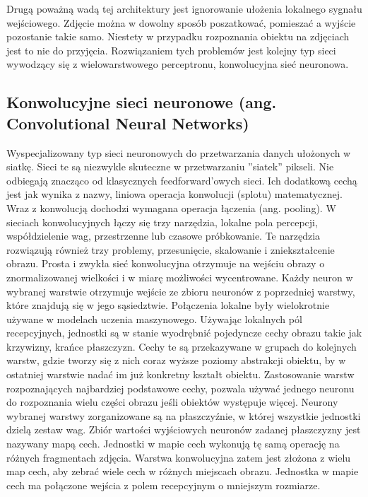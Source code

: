 \documentclass[12pt,a4paper,twoside,titlepage,openright]{book}
\begin{document}
Drugą poważną wadą tej architektury jest ignorowanie ułożenia lokalnego sygnału wejściowego. Zdjęcie można w dowolny sposób poszatkować, pomieszać a wyjście pozostanie takie samo. Niestety w przypadku rozpoznania obiektu na zdjęciach jest to nie do przyjęcia. Rozwiązaniem tych problemów jest kolejny typ sieci wywodzący się z wielowarstwowego perceptronu, konwolucyjna sieć neuronowa.

\subsection{Konwolucyjne sieci neuronowe (ang. Convolutional Neural Networks)}
Wyspecjalizowany typ sieci neuronowych do przetwarzania danych ułożonych w siatkę. Sieci te są niezwykle skuteczne w przetwarzaniu ''siatek'' pikseli. Nie odbiegają znacząco od klasycznych feedforward'owych sieci. Ich dodatkową cechą jest jak wynika z nazwy, liniowa operacja konwolucji (splotu) matematycznej. Wraz z konwolucją dochodzi wymagana operacja łączenia (ang. pooling).  W sieciach konwolucyjnych łączy się trzy narzędzia, lokalne pola percepcji, współdzielenie wag, przestrzenne lub czasowe próbkowanie. Te narzędzia rozwiązują również trzy problemy, przesunięcie, skalowanie i zniekształcenie obrazu.
Prosta i zwykła sieć konwolucyjna otrzymuje na wejściu obrazy o znormalizowanej wielkości i w miarę możliwości wycentrowane. Każdy neuron w wybranej warstwie otrzymuje wejście ze zbioru neuronów z poprzedniej warstwy, które znajdują się w jego sąsiedztwie. Połączenia lokalne były wielokrotnie używane w modelach uczenia maszynowego. Używając lokalnych pól recepcyjnych, jednostki są w stanie wyodrębnić pojedyncze cechy obrazu takie jak krzywizny, krańce płaszczyzn. Cechy te są przekazywane w grupach do kolejnych warstw, gdzie tworzy się z nich coraz wyższe poziomy abstrakcji obiektu, by w ostatniej warstwie nadać im już konkretny kształt obiektu. Zastosowanie warstw rozpoznających najbardziej podstawowe cechy, pozwala używać jednego neuronu do rozpoznania wielu części obrazu jeśli obiektów występuje więcej. Neurony wybranej warstwy zorganizowane są na płaszczyźnie, w której wszystkie jednostki dzielą zestaw wag. Zbiór wartości wyjściowych neuronów zadanej płaszczyzny jest nazywany mapą cech. Jednostki w mapie cech wykonują tę samą operację na różnych fragmentach zdjęcia. Warstwa konwolucyjna zatem jest złożona z wielu map cech, aby zebrać wiele cech w różnych miejscach obrazu. Jednostka w mapie cech ma połączone wejścia z polem recepcyjnym o mniejszym rozmiarze.
\end{document}
